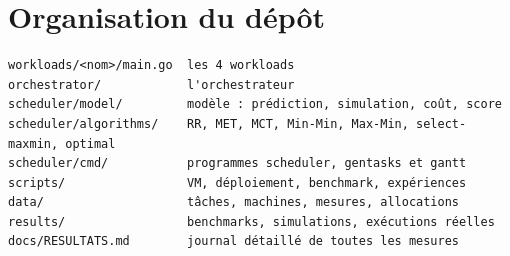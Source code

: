 \section{Organisation du dépôt}

\begin{lstlisting}
workloads/<nom>/main.go  les 4 workloads
orchestrator/            l'orchestrateur
scheduler/model/         modèle : prédiction, simulation, coût, score
scheduler/algorithms/    RR, MET, MCT, Min-Min, Max-Min, select-maxmin, optimal
scheduler/cmd/           programmes scheduler, gentasks et gantt
scripts/                 VM, déploiement, benchmark, expériences
data/                    tâches, machines, mesures, allocations
results/                 benchmarks, simulations, exécutions réelles
docs/RESULTATS.md        journal détaillé de toutes les mesures
\end{lstlisting}

